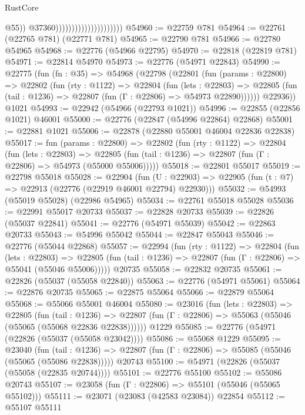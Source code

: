 \begin{lexlean}{RustCore}
\begin{coremodule}
                                                  @55))
                                              @37360)))))))))))))))))))))
@54960 := @22759 @781
@54964 := @22761 (@22765 @781) (@22771 @781)
@54965 := @22790 @781
@54966 := @22780 @54965
@54968 := @22776 (@54966 @22795)
@54970 := @22818 (@22819 @781)
@54971 := @22814 @54970
@54973 := @22776 (@54971 @22843)
@54990 := @22775
    (fun (fn : @35) =>
    @54968
      (@22798
        (@22801
          (fun (params : @22800) =>
          @22802
            (fun (rty : @1122) =>
            @22804
              (fun (lets : @22803) =>
              @22805 (fun (tail : @1236) => @22807 (fun (Γ : @22806) => @54973 @22890))))))
        @22936))
    @1021
@54993 := @22942 (@54966 (@22793 @1021))
@54996 := @22855 (@22856 @1021) @46001
@55000 := @22776 (@22847 (@54996 @22864) @22868)
@55001 := @22881 @1021
@55006 := @22878 (@22880 @55001 @46004 @22836 @22838)
@55017 := fun (params : @22800) =>
  @22802
    (fun (rty : @1122) =>
    @22804
      (fun (lets : @22803) =>
      @22805 (fun (tail : @1236) => @22807 (fun (Γ : @22806) => @54973 (@55000 @55006)))))
@55018 := @22801 @55017
@55019 := @22798 @55018
@55028 := @22904
    (fun (U : @22903) => @22905 (fun (t : @7) => @22913 (@22776 (@22919 @46001 @22794) @22930)))
@55032 := @54993 (@55019 @55028) (@22986 @54965)
@55034 := @22761 @55018 @55028
@55036 := @22991 @55017 @20733
@55037 := @22828 @20733
@55039 := @22826 (@55037 @22841)
@55041 := @22776 (@54971 @55039)
@55042 := @22863 @20733
@55043 := @54996 @55042
@55044 := @22847 @55043
@55046 := @22776 (@55044 @22868)
@55057 := @22994
    (fun (rty : @1122) =>
    @22804
      (fun (lets : @22803) =>
      @22805 (fun (tail : @1236) => @22807 (fun (Γ : @22806) => @55041 (@55046 @55006)))))
    @20735
@55058 := @22832 @20735
@55061 := @22826 (@55037 (@55058 @22840))
@55063 := @22776 (@54971 @55061)
@55064 := @22876 @20735
@55065 := @22875 @55064
@55066 := @22879 @55064
@55068 := @55066 @55001 @46004
@55080 := @23016
    (fun (lets : @22803) =>
    @22805
      (fun (tail : @1236) =>
      @22807 (fun (Γ : @22806) => @55063 (@55046 (@55065 (@55068 @22836 @22838))))))
    @1229
@55085 := @22776 (@54971 (@22826 (@55037 (@55058 @23042))))
@55086 := @55068 @1229
@55095 := @23040
    (fun (tail : @1236) => @22807 (fun (Γ : @22806) => @55085 (@55046 (@55065 (@55086 @22838)))))
    @20743
@55100 := @54971 (@22826 (@55037 (@55058 (@22835 @20744))))
@55101 := @22776 @55100
@55102 := @55086 @20743
@55107 := @23058 (fun (Γ : @22806) => @55101 (@55046 (@55065 @55102)))
@55111 := @23071 (@23083 (@42583 @23084)) @22854
@55112 := @55107 @55111

\end{coremodule}
\end{lexlean}
